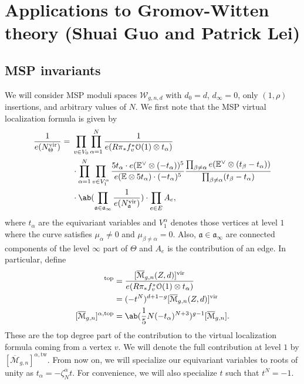 \documentclass[10pt]{amsart}
\theoremstyle{definition}
\theoremstyle{remark}
\theoremstyle{plain}
\theoremstyle{definition}
\theoremstyle{remark}
\newcommand{\E}{\mathbb{E}}
\newcommand{\Mbar}{\overline{\mathcal{M}}}
\newcommand{\mc}[1]{\mathcal{#1}}
\newcommand{\mf}[1]{\mathfrak{#1}}
\newcommand{\mr}[1]{\mathrm{#1}}
\newcommand{\1}{\mathbf{1}}
\newcommand{\2}{\mathbf{2}}
\newcommand{\3}{\mathbf{3}}
\newcommand{\vir}{\mr{vir}}
\newcommand{\tw}{\mr{tw}}
\begin{document}
\section{Applications to Gromov-Witten theory (Shuai Guo and Patrick Lei)}%
\label{sec:Applications to Gromov-Witten theory}

\subsection{MSP invariants}%
\label{sub:MSP invariants}

We will consider MSP moduli spaces $\mc{W}_{g,n,d}$ with $d_0 = d$, $d_{\infty} = 0$, only $(1,\rho)$ insertions, and arbitrary values of $N$. We first note that the MSP virtual localization formula is given by
\begin{align*}
    \frac{1}{e(N_{\Theta}^{\vir})} ={}& \prod_{v \in V_0} \prod_{\alpha=1}^N \frac{1}{e(R \pi_* f_v^* \mc{O}(1) \otimes t_{\alpha})} \\
    & \cdot \prod_{\alpha=1}^N \prod_{v \in V_1^{\alpha}} \frac{5 t_{\alpha} \cdot e(\E^{\vee}\otimes (-t_{\alpha}))^5}{e(\E \otimes 5 t_{\alpha})\cdot (-t_{\alpha})^5} \frac{\prod_{\beta \neq \alpha} e(\E^{\vee} \otimes (t_{\beta} - t_{\alpha}))}{\prod_{\beta \neq \alpha} (t_{\beta} - t_{\alpha})} \\
    &\cdot \ab( \prod_{\mf{a} \in \mf{a}_{\infty}} \frac{1}{e(N_{\mf{a}}^{\vir})} ) \cdot \prod_{e \in E} A_e,
\end{align*}
where $t_{\alpha}$ are the equivariant variables and $V_1^{\alpha}$ denotes those vertices at level $1$ where the curve satisfies $\mu_{\alpha} \neq 0$ and $\mu_{\beta \neq \alpha} = 0$. Also, $\mf{a} \in \mf{a}_{\infty}$ are connected components of the level $\infty$ part of $\Theta$ and $A_e$ is the contribution of an edge. In particular, define
\begin{align*}
    [\Mbar_{g,n}(Z,d)]^{\mr{top}} &= \frac{[\Mbar_{g,n}(Z,d)]^{\vir}}{e(R\pi_* f_v^* \mc{O}(1) \otimes t_{\alpha})} \\
    &= (-t^N)^{d+1-g} [\Mbar_{g,n}(Z,d)]^{\vir} \\
    [\Mbar_{g,n}]^{\alpha,\mr{top}} &= \ab(\frac{1}{5}N(-t_{\alpha})^{N+3})^{g-1} [\Mbar_{g,n}].
\end{align*}
These are the top degree part of the contribution to the virtual localization formula coming from a vertex $v$. We will denote the full contribution at level $1$ by $[\Mbar_{g,n}]^{\alpha,\tw}$. From now on, we will specialize our equivariant variables to roots of unity as $t_{\alpha} = -\zeta_N^{\alpha} t$. For convenience, we will also specialize $t$ such that $t^N = -1$.
\end{document}
